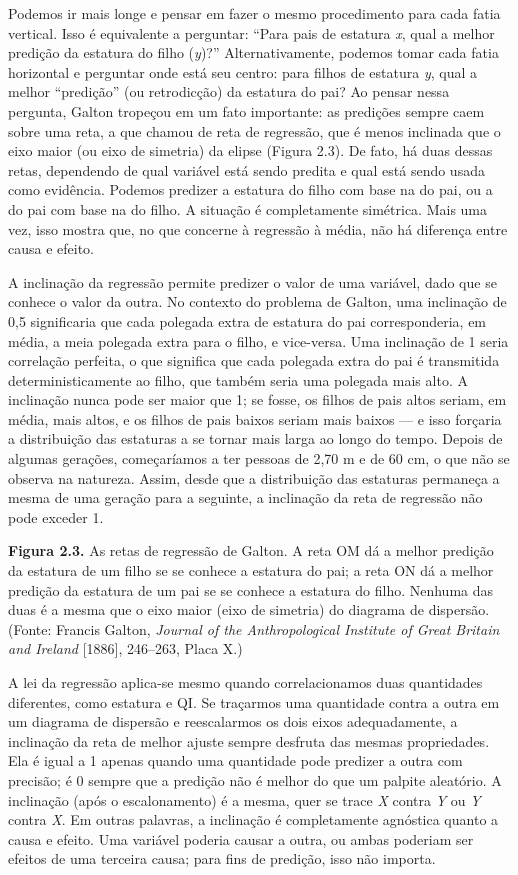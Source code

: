 \documentclass[11pt,a5paper,twoside]{book}
\begin{document}
Podemos ir mais longe e pensar em fazer o mesmo procedimento para cada fatia vertical. Isso é equivalente a perguntar: “Para pais de estatura \textit{x}, qual a melhor predição da estatura do filho (\textit{y})?” Alternativamente, podemos tomar cada fatia horizontal e perguntar onde está seu centro: para filhos de estatura \textit{y}, qual a melhor “predição” (ou retrodicção) da estatura do pai? Ao pensar nessa pergunta, Galton tropeçou em um fato importante: as predições sempre caem sobre uma reta, a que chamou de reta de regressão, que é menos inclinada que o eixo maior (ou eixo de simetria) da elipse (Figura 2.3). De fato, há duas dessas retas, dependendo de qual variável está sendo predita e qual está sendo usada como evidência. Podemos predizer a estatura do filho com base na do pai, ou a do pai com base na do filho. A situação é completamente simétrica. Mais uma vez, isso mostra que, no que concerne à regressão à média, não há diferença entre causa e efeito.

A inclinação da regressão permite predizer o valor de uma variável, dado que se conhece o valor da outra. No contexto do problema de Galton, uma inclinação de 0,5 significaria que cada polegada extra de estatura do pai corresponderia, em média, a meia polegada extra para o filho, e vice-versa. Uma inclinação de 1 seria correlação perfeita, o que significa que cada polegada extra do pai é transmitida deterministicamente ao filho, que também seria uma polegada mais alto. A inclinação nunca pode ser maior que 1; se fosse, os filhos de pais altos seriam, em média, mais altos, e os filhos de pais baixos seriam mais baixos — e isso forçaria a distribuição das estaturas a se tornar mais larga ao longo do tempo. Depois de algumas gerações, começaríamos a ter pessoas de 2,70 m e de 60 cm, o que não se observa na natureza. Assim, desde que a distribuição das estaturas permaneça a mesma de uma geração para a seguinte, a inclinação da reta de regressão não pode exceder 1.

\textbf{Figura 2.3.} As retas de regressão de Galton. A reta OM dá a melhor predição da estatura de um filho se se conhece a estatura do pai; a reta ON dá a melhor predição da estatura de um pai se se conhece a estatura do filho. Nenhuma das duas é a mesma que o eixo maior (eixo de simetria) do diagrama de dispersão. (Fonte: Francis Galton, \textit{Journal of the Anthropological Institute of Great Britain and Ireland} [1886], 246–263, Placa X.)

A lei da regressão aplica-se mesmo quando correlacionamos duas quantidades diferentes, como estatura e QI. Se traçarmos uma quantidade contra a outra em um diagrama de dispersão e reescalarmos os dois eixos adequadamente, a inclinação da reta de melhor ajuste sempre desfruta das mesmas propriedades. Ela é igual a 1 apenas quando uma quantidade pode predizer a outra com precisão; é 0 sempre que a predição não é melhor do que um palpite aleatório. A inclinação (após o escalonamento) é a mesma, quer se trace \textit{X} contra \textit{Y} ou \textit{Y} contra \textit{X}. Em outras palavras, a inclinação é completamente agnóstica quanto a causa e efeito. Uma variável poderia causar a outra, ou ambas poderiam ser efeitos de uma terceira causa; para fins de predição, isso não importa.
\end{document}
